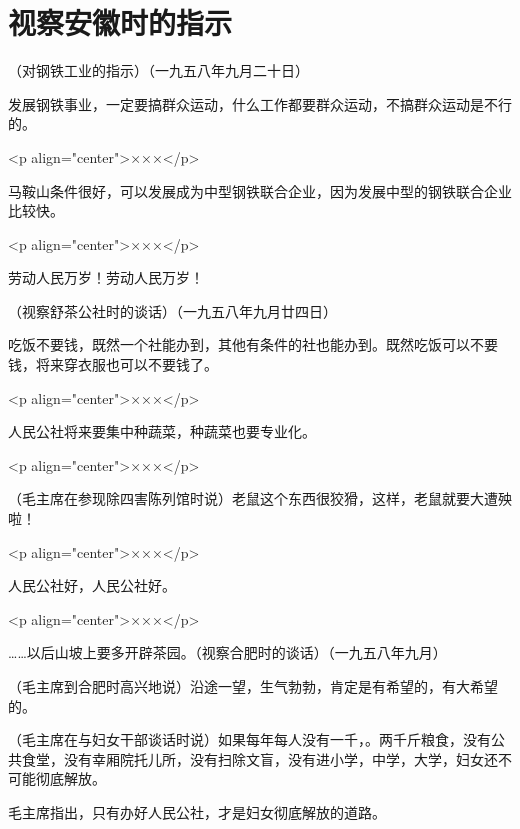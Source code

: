\section[视察安徽时的指示（一九五八年九月）]{视察安徽时的指示}


（对钢铁工业的指示）（一九五八年九月二十日）

发展钢铁事业，一定要搞群众运动，什么工作都要群众运动，不搞群众运动是不行的。

<p align="center">×××</p>

马鞍山条件很好，可以发展成为中型钢铁联合企业，因为发展中型的钢铁联合企业比较快。

<p align="center">×××</p>

劳动人民万岁！劳动人民万岁！

（视察舒茶公社时的谈话）（一九五八年九月廿四日）

吃饭不要钱，既然一个社能办到，其他有条件的社也能办到。既然吃饭可以不要钱，将来穿衣服也可以不要钱了。

<p align="center">×××</p>

人民公社将来要集中种蔬菜，种蔬菜也要专业化。

<p align="center">×××</p>

（毛主席在参现除四害陈列馆时说）老鼠这个东西很狡猾，这样，老鼠就要大遭殃啦！

<p align="center">×××</p>

人民公社好，人民公社好。

<p align="center">×××</p>

……以后山坡上要多开辟茶园。（视察合肥时的谈话）（一九五八年九月）

（毛主席到合肥时高兴地说）沿途一望，生气勃勃，肯定是有希望的，有大希望的。

（毛主席在与妇女干部谈话时说）如果每年每人没有一千，。两千斤粮食，没有公共食堂，没有幸厢院托儿所，没有扫除文盲，没有进小学，中学，大学，妇女还不可能彻底解放。

毛主席指出，只有办好人民公社，才是妇女彻底解放的道路。


